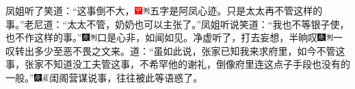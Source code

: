 凤姐听了笑道：“这事倒不大，{\includegraphics[width=3mm]{../Images/00002}\includegraphics[width=3mm]{../Images/00011}\footnotesize \kaishu 五字是阿凤心迹。}只是太太再不管这样的事。”老尼道：“太太不管，奶奶也可以主张了。”凤姐听说笑道：“我也不等银子使，也不作这样的事。”{\includegraphics[width=3mm]{../Images/00004}\includegraphics[width=3mm]{../Images/00011}\footnotesize \kaishu 口是心非，如闻如见。}净虚听了，打去妄想，半晌叹{\includegraphics[width=3mm]{../Images/00004}\includegraphics[width=3mm]{../Images/00011}\footnotesize \kaishu 一叹转出多少至恶不畏之文来。}道：“虽如此说，张家已知我来求府里，如今不管这事，张家不知道没工夫管这事，不希罕他的谢礼，倒像府里连这点子手段也没有的一般。”{\includegraphics[width=3mm]{../Images/00004}\includegraphics[width=3mm]{../Images/00010}\footnotesize \kaishu 闺阁营谋说事，往往被此等语惑了。}

